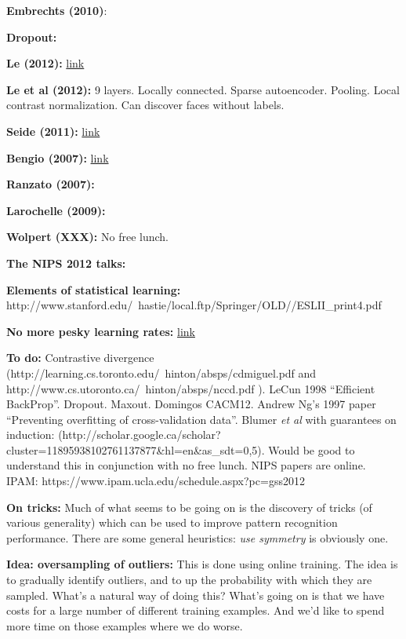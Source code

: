 \documentclass[12pt]{article}
\newcommand{\link}[2]{\href{#1}{#2}}
\begin{document}
\textbf{Embrechts (2010)}:

\textbf{Dropout:}

\textbf{Le (2012):} \link{https://plus.google.com/u/0/+ResearchatGoogle/posts/EMyhnBetd2F}{link}

\textbf{Le et al (2012):} 9 layers.  Locally connected.  Sparse
autoencoder.  Pooling.  Local contrast normalization.  Can discover
faces without labels.

\textbf{Seide (2011):}
\link{http://research.microsoft.com/apps/pubs/default.aspx?id=153169}{link}

\textbf{Bengio (2007):} \link{http://arxiv.org/pdf/1206.5533v2.pdf}{link}

\textbf{Ranzato (2007):}

\textbf{Larochelle (2009):}

\textbf{Wolpert (XXX):} No free lunch.

\textbf{The NIPS 2012 talks:}

\textbf{Elements of statistical learning:} http://www.stanford.edu/~hastie/local.ftp/Springer/OLD//ESLII_print4.pdf

\textbf{No more pesky learning rates:} \link{http://arxiv.org/pdf/1206.1106.pdf}{link}

\textbf{To do:} Contrastive divergence
(http://learning.cs.toronto.edu/~hinton/absps/cdmiguel.pdf and
http://www.cs.utoronto.ca/~hinton/absps/nccd.pdf ). LeCun 1998
``Efficient BackProp''.  Dropout.  Maxout. Domingos CACM12.  Andrew
Ng's 1997 paper ``Preventing overfitting of cross-validation data''.
Blumer \emph{et al} with guarantees on induction:
(http://scholar.google.ca/scholar?cluster=11895938102761137877\&hl=en\&as\_sdt=0,5).
Would be good to understand this in conjunction with no free lunch.
NIPS papers are online.  IPAM: https://www.ipam.ucla.edu/schedule.aspx?pc=gss2012

\textbf{On tricks:} Much of what seems to be going on is the discovery
of tricks (of various generality) which can be used to improve pattern
recognition performance.  There are some general heuristics: \emph{use
  symmetry} is obviously one.

\textbf{Idea: oversampling of outliers:} This is done using online
training.  The idea is to gradually identify outliers, and to up the
probability with which they are sampled.  What's a natural way of
doing this?  What's going on is that we have costs for a large number
of different training examples.  And we'd like to spend more time on
those examples where we do worse.  
\end{document}
